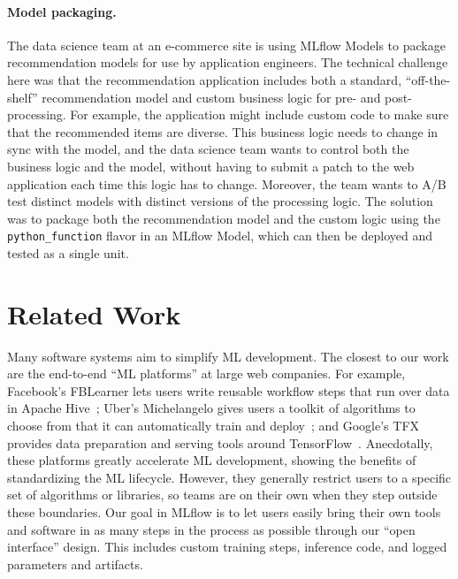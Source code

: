 \documentclass[11pt]{article}
\begin{document}
\paragraph{Model packaging.} The data science team at an e-commerce site is using MLflow Models to package recommendation models for use by application engineers. The technical challenge here was that the recommendation application includes both a standard, ``off-the-shelf'' recommendation model and custom business logic for pre- and post-processing. For example, the application might include custom code to make sure that the recommended items are diverse. This business logic needs to change in sync with the model, and the data science team wants to control both the business logic and the model, without having to submit a patch to the web application each time this logic has to change.
Moreover, the team wants to A/B test distinct models with distinct versions of the processing logic.
The solution was to package both the recommendation model and the custom logic using the \texttt{python\_function} flavor in an MLflow Model, which can then be deployed and tested as a single unit. %

\section{Related Work}

Many software systems aim to simplify ML development.
The closest to our work are the end-to-end ``ML platforms'' at large web companies.
For example, Facebook's FBLearner lets users write reusable workflow steps that run over data in Apache Hive~\cite{fblearner};
Uber's Michelangelo gives users a toolkit of algorithms to choose from that it can automatically train and deploy~\cite{michelangelo}; and Google's TFX provides data preparation and serving tools around TensorFlow~\cite{tfx}.
Anecdotally, these platforms greatly accelerate ML development, showing the benefits of standardizing the ML lifecycle.
However, they generally restrict users to a specific set of algorithms or libraries, so teams are on their own when they step outside these boundaries.
Our goal in MLflow is to let users easily bring their own tools and software in as many steps in the process as possible through our ``open interface'' design.
This includes custom training steps, inference code, and logged parameters and artifacts.
\end{document}
